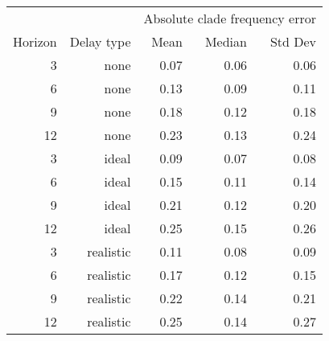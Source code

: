 
\begin{tabular*}{0.7\textwidth}{rrrrr}
\toprule
        &            & \multicolumn{3}{c}{Absolute clade frequency error} \\
Horizon & Delay type & Mean & Median & Std Dev \\
\midrule

3 & none & 0.07 & 0.06 & 0.06 \\
6 & none & 0.13 & 0.09 & 0.11 \\
9 & none & 0.18 & 0.12 & 0.18 \\
12 & none & 0.23 & 0.13 & 0.24 \\
3 & ideal & 0.09 & 0.07 & 0.08 \\
6 & ideal & 0.15 & 0.11 & 0.14 \\
9 & ideal & 0.21 & 0.12 & 0.20 \\
12 & ideal & 0.25 & 0.15 & 0.26 \\
3 & realistic & 0.11 & 0.08 & 0.09 \\
6 & realistic & 0.17 & 0.12 & 0.15 \\
9 & realistic & 0.22 & 0.14 & 0.21 \\
12 & realistic & 0.25 & 0.14 & 0.27 \\

\bottomrule
\end{tabular*}

